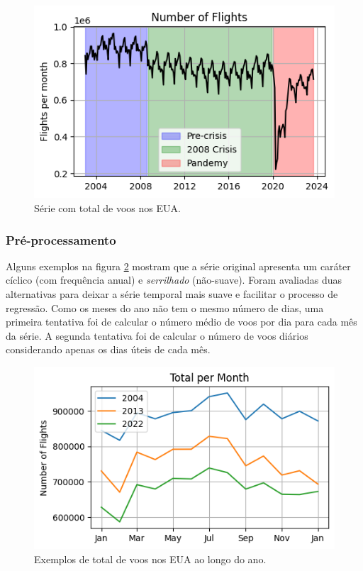 \documentclass[final,5p]{elsarticle}
\numberwithin{equation}{section}
\begin{document}
    \begin{figure}[hbt!]
        \includegraphics[width=0.95\columnwidth]{A_MainSeries.png}
        \caption{Série com total de voos nos EUA.}
        \label{fig:principal}
    \end{figure}

    \subsubsection{Pré-processamento}
    Alguns exemplos na figura \ref{fig:exemplo_original} mostram que a série original apresenta um caráter cíclico (com frequência anual) e \emph{serrilhado} (não-suave). Foram avaliadas duas alternativas para deixar a série temporal mais suave e facilitar o processo de regressão. Como os meses do ano não tem o mesmo número de dias, uma primeira tentativa foi de calcular o número médio de voos por dia para cada mês da série. A segunda tentativa foi de calcular o número de voos diários considerando apenas os dias úteis de cada mês.

    \begin{figure}[hbt!]
        \includegraphics[width=0.95\columnwidth]{A_Total_per_Month.png}
        \caption{Exemplos de total de voos nos EUA ao longo do ano.}
        \label{fig:exemplo_original}
    \end{figure}
\end{document}
